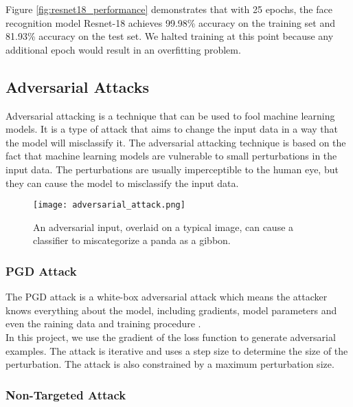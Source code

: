 Figure \ref{fig:resnet18_performance} demonstrates that with 25 epochs, the face recognition model Resnet-18 achieves 99.98\% accuracy on the training set and 81.93\% accuracy on the test set. We halted training at this point because any additional epoch would result in an overfitting problem.

\subsection{Adversarial Attacks}


Adversarial attacking is a technique that can be used to fool machine learning models. It is a type of attack that aims to change the input data in a way that the model will misclassify it. The adversarial attacking technique is based on the fact that machine learning models are vulnerable to small perturbations in the input data. The perturbations are usually imperceptible to the human eye, but they can cause the model to misclassify the input data. \cite{adversarial_2020}

\begin{figure}[h]
    \centering
    \texttt{[image: adversarial\_attack.png]}
    \caption{An adversarial input, overlaid on a typical image, can cause a classifier to miscategorize a panda as a gibbon.}
    \label{fig:adversarial_attack}
\end{figure}

\subsubsection{PGD Attack}

The PGD attack is a white-box adversarial attack which means the attacker knows everything about the model, including gradients, model parameters and even the raining data and training procedure \cite{madry2017towards}. \\

In this project, we use the gradient of the loss function to generate adversarial examples. The attack is iterative and uses a step size to determine the size of the perturbation. The attack is also constrained by a maximum perturbation size.

\subsubsection{Non-Targeted Attack}

